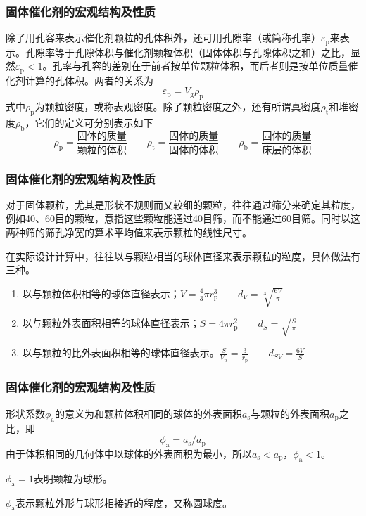 \begin{frame}
    \frametitle{固体催化剂的宏观结构及性质}

    

    除了用孔容来表示催化剂颗粒的孔体积外，还可用孔隙率（或简称孔率）$\varepsilon_\mathrm{p}$来表示。孔隙率等于孔隙体积与催化剂颗粒体积（固体体积与孔隙体积之和）之比，显然$\varepsilon_\mathrm{p} < 1$。孔率与孔容的差别在于前者按单位颗粒体积，而后者则是按单位质量催化剂计算的孔体积。两者的关系为
    \[
        \varepsilon_\mathrm{p} = V_\mathrm{g} \rho_\mathrm{p}
    \]
    式中$\rho_\mathrm{p}$为颗粒密度，或称表观密度。除了颗粒密度之外，还有所谓真密度$\rho_\mathrm{t}$和堆密度$\rho_\mathrm{b}$，它们的定义可分别表示如下
    \[
        \rho_\mathrm{p} = \frac{\text{固体的质量}}{\text{颗粒的体积}} \qquad \rho_\mathrm{t} = \frac{\text{固体的质量}}{\text{固体的体积}} \qquad \rho_\mathrm{b} = \frac{\text{固体的质量}}{\text{床层的体积}}
    \]

\end{frame}


\begin{frame}
    \frametitle{固体催化剂的宏观结构及性质}


    对于固体颗粒，尤其是形状不规则而又较细的颗粒，往往通过筛分来确定其粒度，例如40、60目的颗粒，意指这些颗粒能通过40目筛，而不能通过60目筛。同时以这两种筛的筛孔净宽的算术平均值来表示颗粒的线性尺寸。
    
    \bigskip

    在实际设计计算中，往往以与颗粒相当的球体直径来表示颗粒的粒度，具体做法有三种。
    
    \begin{enumerate}
        \item 以与颗粒体积相等的球体直径表示；$V = \frac{4}{3}\pi r_\mathrm{p}^3 \qquad d_{V} = \sqrt[3]{\frac{6V}{\pi}}$
        \item 以与颗粒外表面积相等的球体直径表示；$S = 4\pi r_\mathrm{p}^2 \qquad d_S = \sqrt{\frac{S}{\pi}}$
        \item 以与颗粒的比外表面积相等的球体直径表示。$\frac{S}{V_\mathrm{p}} = \frac{3}{r_\mathrm{p}} \qquad d_{SV} = \frac{6V}{S}$
    \end{enumerate}

\end{frame}


\begin{frame}
    \frametitle{固体催化剂的宏观结构及性质}


    形状系数$\phi_\mathrm{a}$的意义为和颗粒体积相同的球体的外表面积$a_\mathrm{s}$与颗粒的外表面积$a_\mathrm{p}$之比，即
    \[
        \phi_\mathrm{a} = a_\mathrm{s} / a_\mathrm{p}
    \]
    由于体积相同的几何体中以球体的外表面积为最小，所以$a_\mathrm{s} < a_\mathrm{p}$，$\phi_\mathrm{a} < 1$。
    
    $\phi_\mathrm{a} = 1$表明颗粒为球形。
    
    $\phi_\mathrm{a}$表示颗粒外形与球形相接近的程度，又称圆球度。

\end{frame}


